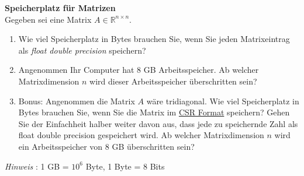 \textbf{Speicherplatz für Matrizen}\\
Gegeben sei eine Matrix $A \in \mathbb{R}^{n \times n}$. 
\begin{enumerate}
	\item Wie viel Speicherplatz in Bytes brauchen Sie, wenn Sie jeden Matrixeintrag als \textit{float double precision} speichern?
	\item Angenommen Ihr Computer hat 8 GB Arbeitsspeicher. Ab welcher Matrixdimension $n$ wird dieser Arbeitsspeicher überschritten sein?
	\item Bonus: Angenommen die Matrix $A$ wäre tridiagonal. Wie viel Speicherplatz in Bytes brauchen Sie, wenn Sie die Matrix im \href{https://en.wikipedia.org/wiki/Sparse_matrix#Compressed_sparse_row_(CSR,_CRS_or_Yale_format)}{CSR Format} speichern? Gehen Sie der Einfachheit halber weiter davon aus, dass jede zu speichernde Zahl als float double precision gespeichert wird. Ab welcher Matrixdimension $n$ wird ein Arbeitsspeicher von 8 GB überschritten sein?
\end{enumerate}

\textit{Hinweis }: 1 GB = $10^6$ Byte, 1 Byte = 8 Bits